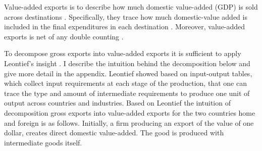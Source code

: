 Value-added exports is to describe how much domestic value-added (GDP) is sold across destinations \textcite{johnson}.
Specifically, they trace how much domestic-value added is included in the final expenditures in each destination \textcite{Johnson2012}.
Moreover, value-added exports is net of any double counting \textcite{Koopman}.
\par
%
To decompose gross exports into value-added exports it is sufficient to apply Leontief's insight \textcite{wang2013}.
 I describe the intuition behind the decomposition below and give more detail in the appendix.
  Leontief showed based on input-output tables, which collect input requirements at each stage of the production, that one can trace the type and amount of intermediate  requirements to produce one unit of output across countries and industries.
  Based on Leontief  the intuition of decomposition gross exports into value-added exports for the two countries home and foreign is as follows.
  Initially, a firm producing an export of the value of one dollar, creates direct domestic value-added.
  The good is produced with intermediate goods itself.
